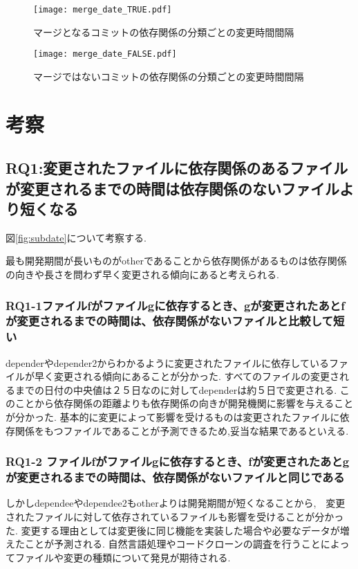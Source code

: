 \documentclass{fose2016}           %
\begin{document}
\begin{figure}
\centering
\begin{minipage}{0.49\columnwidth}
\centering
\texttt{[image: merge\_date\_TRUE.pdf]}
\caption{マージとなるコミットの依存関係の分類ごとの変更時間間隔}
\label{fig:merge_true_subdate} 
\end{minipage}
\begin{minipage}{0.49\columnwidth}
\centering
\texttt{[image: merge\_date\_FALSE.pdf]}
\caption{マージではないコミットの依存関係の分類ごとの変更時間間隔}
\label{fig:merge_false_subdate}
\end{minipage}
\end{figure}


\section{考察}\label{考察}

\subsection{RQ1:変更されたファイルに依存関係のあるファイルが変更されるまでの時間は依存関係のないファイルより短くなる}
図\ref{fig:subdate}について考察する.

最も開発期間が長いものがotherであることから依存関係があるものは依存関係の向きや長さを問わず早く変更される傾向にあると考えられる.
\subsubsection{RQ1-1ファイルfがファイルgに依存するとき、gが変更されたあとfが変更されるまでの時間は、依存関係がないファイルと比較して短い}
dependerやdepender2からわかるように変更されたファイルに依存しているファイルが早く変更される傾向にあることが分かった.
すべてのファイルの変更されるまでの日付の中央値は２５日なのに対してdependerは約５日で変更される.
このことから依存関係の距離よりも依存関係の向きが開発機関に影響を与えることが分かった.
基本的に変更によって影響を受けるものは変更されたファイルに依存関係をもつファイルであることが予測できるため,妥当な結果であるといえる.

\subsubsection{RQ1-2 ファイルfがファイルgに依存するとき、fが変更されたあとgが変更されるまでの時間は、依存関係がないファイルと同じである}
しかしdependeeやdependee2もotherよりは開発期間が短くなることから,　変更されたファイルに対して依存されているファイルも影響を受けることが分かった.
変更する理由としては変更後に同じ機能を実装した場合や必要なデータが増えたことが予測される.
自然言語処理やコードクローンの調査を行うことによってファイルや変更の種類について発見が期待される.
\end{document}

